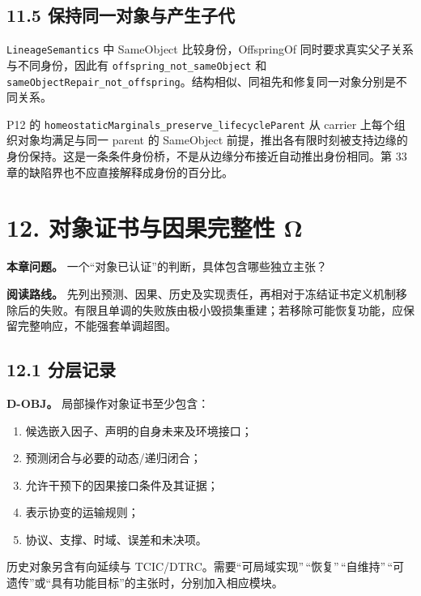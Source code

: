 \documentclass[
  11pt,
  oneside]{book}
\providecommand{\tightlist}{%
  \setlength{\itemsep}{0pt}\setlength{\parskip}{0pt}}
\begin{document}
\section{11.5 保持同一对象与产生子代}\label{ux4fddux6301ux540cux4e00ux5bf9ux8c61ux4e0eux4ea7ux751fux5b50ux4ee3}

\nolinkurl{LineageSemantics} 中 SameObject 比较身份，OffspringOf 同时要求真实父子关系与不同身份，因此有 \nolinkurl{offspring_not_sameObject} 和 \nolinkurl{sameObjectRepair_not_offspring}。结构相似、同祖先和修复同一对象分别是不同关系。

P12 的 \nolinkurl{homeostaticMarginals_preserve_lifecycleParent} 从 carrier 上每个组织对象均满足与同一 parent 的 SameObject 前提，推出各有限时刻被支持边缘的身份保持。这是一条条件身份桥，不是从边缘分布接近自动推出身份相同。第 33 章的缺陷界也不应直接解释成身份的百分比。

\chapter{12. 对象证书与因果完整性 Ω}\label{ch-12}

\textbf{本章问题。} 一个``对象已认证''的判断，具体包含哪些独立主张？

\textbf{阅读路线。} 先列出预测、因果、历史及实现责任，再相对于冻结证书定义机制移除后的失败。有限且单调的失败族由极小毁损集重建；若移除可能恢复功能，应保留完整响应，不能强套单调超图。

\section{12.1 分层记录}\label{ux5206ux5c42ux8bb0ux5f55}

\textbf{D-OBJ。} 局部操作对象证书至少包含：

\begin{enumerate}
\def\labelenumi{\arabic{enumi}.}
\tightlist
\item
  候选嵌入因子、声明的自身未来及环境接口；
\item
  预测闭合与必要的动态/递归闭合；
\item
  允许干预下的因果接口条件及其证据；
\item
  表示协变的运输规则；
\item
  协议、支撑、时域、误差和未决项。
\end{enumerate}

历史对象另含有向延续与 TCIC/DTRC。需要``可局域实现''\,``恢复''\,``自维持''\,``可遗传''或``具有功能目标''的主张时，分别加入相应模块。
\end{document}
